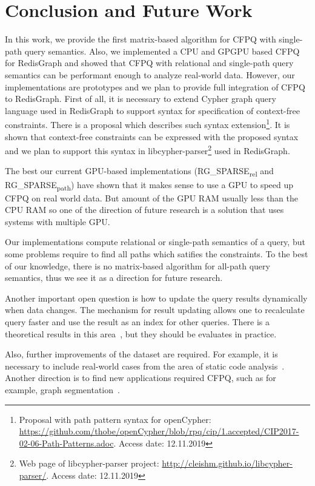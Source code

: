 \section{Conclusion and Future Work}
In this work, we provide the first matrix-based algorithm for CFPQ with single-path query semantics.
Also, we implemented a CPU and GPGPU based CFPQ for RedisGraph and showed that CFPQ with relational and single-path query semantics can be performant enough to analyze real-world data.
However, our implementations are prototypes and we plan to provide full integration of CFPQ to RedisGraph.
First of all, it is necessary to extend Cypher graph query language used in RedisGraph to support syntax for specification of context-free constraints.
There is a proposal which describes such syntax extension\footnote{Proposal with path pattern syntax for openCypher: \url{https://github.com/thobe/openCypher/blob/rpq/cip/1.accepted/CIP2017-02-06-Path-Patterns.adoc}. Access date: 12.11.2019}. It is shown that context-free constraints can be expressed with the proposed syntax and we plan to support this syntax in libcypher-parser\footnote{Web page of libcypher-parser project: \url{http://cleishm.github.io/libcypher-parser/}. Access date: 12.11.2019} used in RedisGraph.

The best our current GPU-based implementations (RG\_SPARSE\textsubscript{rel} and RG\_SPARSE\textsubscript{path}) have shown that it makes sense to use a GPU to speed up CFPQ on real world data. But amount of the GPU RAM usually less than the CPU RAM so one of the direction of future research is a solution that uses systems with multiple GPU.

Our implementations compute relational or single-path semantics of a query, but some problems require to find all paths which satifies the constraints.
To the best of our knowledge, there is no matrix-based algorithm for all-path query semantics, thus we see it as a direction for future research.

Another important open question is how to update the query results dynamically when data changes.
The mechanism for result updating allows one to recalculate query faster and use the result as an index for other queries. There is a theoretical results in this area~\cite{10.1007/978-3-662-54458-7_16}, but they should be evaluates in practice.

Also, further improvements of the dataset are required.
For example, it is necessary to include real-world cases from the area of static code analysis~\cite{Zheng:2008:DAA:1328897.1328464,veduradabatch,LPAR-21:Cauliflower_Solver_Generator_for}.
Another direction is to find new applications required CFPQ, such as for example, graph segmentation~\cite{8731467}. 
